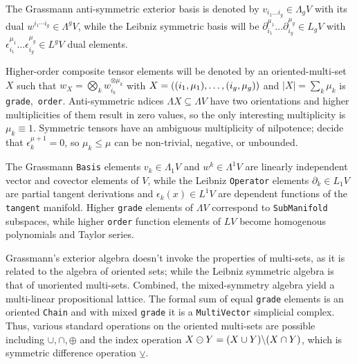 \documentclass{juliacon}
\begin{document}
\begin{definition}
	The Grassmann anti-symmetric exterior basis is denoted by $v_{i_1\dots i_g}\in\Lambda_gV$ with its dual $w^{i_1\cdots i_g}\in\Lambda^gV$, while the Leibniz symmetric basis will be $\partial_{i_1}^{\mu_1}\dots\partial_{i_g}^{\mu_g}\in L_gV$ with $\epsilon_{i_1}^{\mu_1}\dots\epsilon_{i_g}^{\mu_g}\in L^gV$ dual elements.
\end{definition}
Higher-order composite tensor elements will be denoted by an oriented-multi-set $X$ %
such that $w_X = \bigotimes_k w_{i_k}^{\otimes\mu_k}$ with $X = \left((i_1,\mu_1),\dots,(i_g,\mu_g)\right)$ and $|X|=\sum_k\mu_k$ is \verb`grade`,$\,$ \verb`order`.
Anti-symmetric ndices $\Lambda X\subseteq\Lambda V$ have two orientations and higher multiplicities of them result in zero values, so the only interesting multiplicity is $\mu_k\equiv 1$.
Symmetric tensors have an ambiguous multiplicity of nilpotence; decide that $\epsilon_k^{\mu+1}=0$, so $\mu_k\leq\mu$ can be non-trivial, negative, or unbounded.

The Grassmann \verb`Basis` elements $v_k\in\Lambda_1V$ and $w^k\in\Lambda^1V$ are linearly independent vector and covector elements of $V$, while the Leibniz \verb`Operator` elements $\partial_k\in L_1V$ are partial tangent derivations and $\epsilon_k(x)\in L^1V$ are dependent functions of the \verb`tangent` manifold. 
Higher \verb`grade` elements of $\Lambda V$ correspond to \verb`SubManifold` subspaces, while higher \verb`order` function elements of $LV$ become homogenous polynomials and Taylor series.

Grassmann's exterior algebra doesn't invoke the properties of multi-sets, as it is related to the algebra of oriented sets; while the Leibniz symmetric algebra is that of unoriented multi-sets.
Combined, the mixed-symmetry algebra yield a multi-linear propositional lattice.
The formal sum of equal \verb`grade` elements is an oriented \verb`Chain` and with mixed \verb`grade` it is a \verb`MultiVector` simplicial complex.
Thus, various standard operations on the oriented multi-sets are possible including $\cup,\cap,\oplus$ and the index operation $X\ominus Y=(X\cup Y)\backslash(X\cap Y)$, which is symmetric difference operation $\veebar$.
\end{document}
